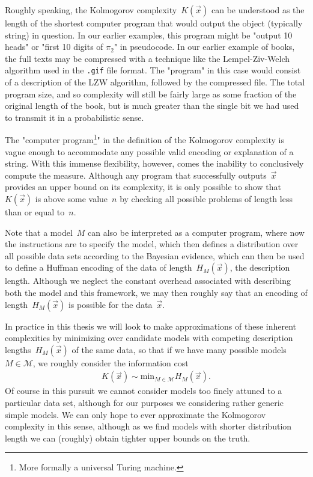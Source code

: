 Roughly speaking, the Kolmogorov complexity~$K(\vec{x})$ can be understood as the length of the shortest computer program that would output the object (typically string) in question. In our earlier examples, this program might be "output 10 heads" or "first 10 digits of $\pi_2$" in pseudocode. In our earlier example of books, the full texts may be compressed with a technique like the Lempel-Ziv-Welch algorithm used in the \verb|.gif| file format. The "program" in this case would consist of a description of the LZW algorithm, followed by the compressed file. The total program size, and so complexity will still be fairly large as some fraction of the original length of the book, but is much greater than the single bit we had used to transmit it in a probabilistic sense. 

The "computer program\footnote{More formally a universal Turing machine.}" in the definition of the Kolmogorov complexity is vague enough to accommodate any possible valid encoding or explanation of a string. With this immense flexibility, however, comes the inability to conclusively compute the measure. Although any program that successfully outputs~$\vec{x}$ provides an upper bound on its complexity, it is only possible to show that~$K(\vec{x})$ is above some value~$n$ by checking all possible problems of length less than or equal to~$n$. 

Note that a model~$M$ can also be interpreted as a computer program, where now the instructions are to specify the model, which then defines a distribution over all possible data sets according to the Bayesian evidence, which can then be used to define a Huffman encoding of the data of length~$H_M(\vec{x})$, the description length. Although we neglect the constant overhead associated with describing both the model and this framework, we may then roughly say that an encoding of length~$H_M(\vec{x})$ is possible for the data~$\vec{x}$. 

In practice in this thesis we will look to make approximations of these inherent complexities by minimizing over candidate models with competing description lengths~$H_M(\vec{x})$ of the same data, so that if we have many possible models~$M \in \mathcal{M}$, we roughly consider the information cost \begin{align}
    K(\vec{x}) \sim \text{min}_{M \in \mathcal{M}} H_{M}(\vec{x}).
\end{align}
Of course in this pursuit we cannot consider models too finely attuned to a particular data set, although for our purposes we considering rather generic simple models. We can only hope to ever approximate the Kolmogorov complexity in this sense, although as we find models with shorter distribution length we can (roughly) obtain tighter upper bounds on the truth.

